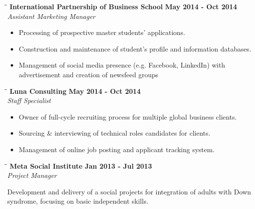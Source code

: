 \documentclass[margin]{res}
\begin{document}
\begin{resume}
\vspace{0.9in}
    \begin{tabbing}
        \hspace{2.3in}\= \hspace{1.7in}\= \kill
        \textbf{International Partnership of Business School} \>\>\textbf{May 2014 - Oct 2014}\\
        \textit{Assistant Marketing Manager}\\        
    \end{tabbing}\vspace{-20pt}
    \vspace{2mm}
    \begin{itemize}
        \item Processing of prospective master students’ applications.
        \item Construction and maintenance of student’s profile and information databases.
        \item Management of social media presence (e.g. Facebook, LinkedIn) with advertisement and creation of newsfeed groups
    \end{itemize}

\vspace{-0.1in}
    \begin{tabbing}
        \hspace{2.3in}\= \hspace{1.7in}\= \kill
        \textbf{Luna Consulting} \>\>\textbf{May 2014 - Oct 2014}\\
        \textit{Staff Specialist}\\        
    \end{tabbing}\vspace{-20pt}
    \vspace{2mm}
    \begin{itemize}
        \item Owner of full-cycle recruiting process for multiple global business clients.
        \item Sourcing \& interviewing of technical roles candidates for clients.
        \item Management of online job posting and applicant tracking system.
    \end{itemize}
  
\vspace{-0.1in}
    \begin{tabbing}
        \hspace{2.3in}\= \hspace{1.7in}\= \kill
        \textbf{Meta Social Institute} \>\>\textbf{Jan 2013 - Jul 2013}\\
        \textit{Project Manager}\\        
    \end{tabbing}\vspace{-20pt}
    \vspace{2mm}
    Development and delivery of a social projects for integration of adults with Down
    syndrome, focusing on basic independent skills.


\end{resume}
\end{document}
